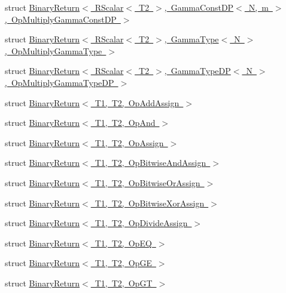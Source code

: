 \begin{DoxyCompactItemize}
\item 
struct \mbox{\hyperlink{structENSEM_1_1BinaryReturn_3_01RScalar_3_01T2_01_4_00_01GammaConstDP_3_01N_00_01m_01_4_00_01OpMultiplyGammaConstDP_01_4}{Binary\+Return$<$ R\+Scalar$<$ T2 $>$, Gamma\+Const\+D\+P$<$ N, m $>$, Op\+Multiply\+Gamma\+Const\+D\+P $>$}}
\item 
struct \mbox{\hyperlink{structENSEM_1_1BinaryReturn_3_01RScalar_3_01T2_01_4_00_01GammaType_3_01N_01_4_00_01OpMultiplyGammaType_01_4}{Binary\+Return$<$ R\+Scalar$<$ T2 $>$, Gamma\+Type$<$ N $>$, Op\+Multiply\+Gamma\+Type $>$}}
\item 
struct \mbox{\hyperlink{structENSEM_1_1BinaryReturn_3_01RScalar_3_01T2_01_4_00_01GammaTypeDP_3_01N_01_4_00_01OpMultiplyGammaTypeDP_01_4}{Binary\+Return$<$ R\+Scalar$<$ T2 $>$, Gamma\+Type\+D\+P$<$ N $>$, Op\+Multiply\+Gamma\+Type\+D\+P $>$}}
\item 
struct \mbox{\hyperlink{structENSEM_1_1BinaryReturn_3_01T1_00_01T2_00_01OpAddAssign_01_4}{Binary\+Return$<$ T1, T2, Op\+Add\+Assign $>$}}
\item 
struct \mbox{\hyperlink{structENSEM_1_1BinaryReturn_3_01T1_00_01T2_00_01OpAnd_01_4}{Binary\+Return$<$ T1, T2, Op\+And $>$}}
\item 
struct \mbox{\hyperlink{structENSEM_1_1BinaryReturn_3_01T1_00_01T2_00_01OpAssign_01_4}{Binary\+Return$<$ T1, T2, Op\+Assign $>$}}
\item 
struct \mbox{\hyperlink{structENSEM_1_1BinaryReturn_3_01T1_00_01T2_00_01OpBitwiseAndAssign_01_4}{Binary\+Return$<$ T1, T2, Op\+Bitwise\+And\+Assign $>$}}
\item 
struct \mbox{\hyperlink{structENSEM_1_1BinaryReturn_3_01T1_00_01T2_00_01OpBitwiseOrAssign_01_4}{Binary\+Return$<$ T1, T2, Op\+Bitwise\+Or\+Assign $>$}}
\item 
struct \mbox{\hyperlink{structENSEM_1_1BinaryReturn_3_01T1_00_01T2_00_01OpBitwiseXorAssign_01_4}{Binary\+Return$<$ T1, T2, Op\+Bitwise\+Xor\+Assign $>$}}
\item 
struct \mbox{\hyperlink{structENSEM_1_1BinaryReturn_3_01T1_00_01T2_00_01OpDivideAssign_01_4}{Binary\+Return$<$ T1, T2, Op\+Divide\+Assign $>$}}
\item 
struct \mbox{\hyperlink{structENSEM_1_1BinaryReturn_3_01T1_00_01T2_00_01OpEQ_01_4}{Binary\+Return$<$ T1, T2, Op\+E\+Q $>$}}
\item 
struct \mbox{\hyperlink{structENSEM_1_1BinaryReturn_3_01T1_00_01T2_00_01OpGE_01_4}{Binary\+Return$<$ T1, T2, Op\+G\+E $>$}}
\item 
struct \mbox{\hyperlink{structENSEM_1_1BinaryReturn_3_01T1_00_01T2_00_01OpGT_01_4}{Binary\+Return$<$ T1, T2, Op\+G\+T $>$}}

\end{DoxyCompactItemize}
